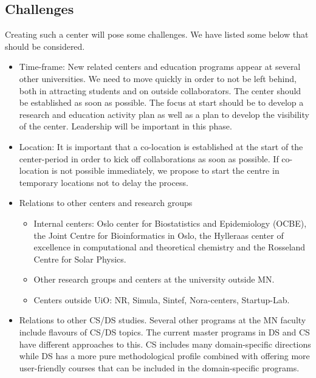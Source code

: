 \documentclass[a4paper,10pt]{article}
\begin{document}
\subsection{Challenges}
Creating such a center will pose some challenges. We have listed some below that should be considered. 
\begin{itemize}
\item Time-frame: New related centers and education programs appear at several other universities. We need to move quickly in order to not be left behind, both in attracting students and on outside collaborators. The center should be established as soon as possible. The focus at start should be to develop a research  and education activity plan as well as a plan to develop the visibility of the center. Leadership will be important in this phase.
\item Location: It is important that a co-location is established at the start of the center-period in order to kick off collaborations as soon as possible. If co-location is not possible immediately, we propose to start the centre in temporary locations not to delay the process.
\item Relations to other centers and research groups
\begin{itemize}
\item Internal centers: Oslo center for Biostatistics and Epidemiology (OCBE), the Joint Centre for Bioinformatics in Oslo, the Hylleraas center of excellence in computational and theoretical chemistry and 
the Rosseland Centre for Solar Physics.
\item Other research groups and centers at the university outside MN.
\item Centers outside UiO: NR, Simula, Sintef, Nora-centers, Startup-Lab. %
\end{itemize}
\item Relations to other CS/DS studies. Several other programs at the MN faculty include flavours of CS/DS topics. The current master programs in DS and CS have different approaches to this. CS includes many domain-specific directions while DS has a more pure methodological profile combined with offering more user-friendly courses that can be included in the domain-specific programs.  
\end{itemize}
\end{document}
